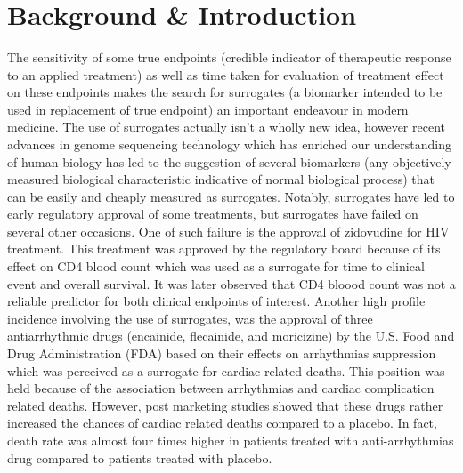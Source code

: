 \documentclass[a4paper,12pt]{article}
\title{
		\begin{flushleft} 
			\Huge {\color{black!90}{\fontfamily{phv}\selectfont 2016\textbullet2017 \\   Faculty of Sciences \\ \large\textit{Master of Statistics} \\ \vspace{1.0in} Master's Thesis \\ Evaluation of Surrogate Endpoints in Human Microbiome \\ \vspace{1.0in} \large Supervisor:\\Prof. dr. Shekdy Ziv \\ \vspace{0.5in} Supervisor:\\ Dr. Van Der Elst, Wim \\ \vspace{1.0in}\Large Olusoji Oluwafemi Daniel\\ \large \textit{Thesis presented in fulfillment of the requirements for the degree of Master of
						Statistics}}}
		\end{flushleft}
	}
\date{}
\begin{document}
	
	
	\maketitle
	\newpage
	
	\tableofcontents
	
	\newpage
	
	\section{Background \& Introduction}
	The sensitivity of some true endpoints (credible indicator of therapeutic response to an applied treatment\citep{buyseM}) as well as time taken for evaluation of treatment effect on these endpoints makes the search for surrogates (a biomarker intended to be used in replacement of true endpoint\citep{buyseM}) an important endeavour in modern medicine\citep{surrogate2}. The use of surrogates actually isn't a wholly new idea\citep{CAST,fleming1}, however recent advances in genome sequencing technology which has enriched our understanding of human biology has led to the suggestion of several biomarkers (any objectively measured biological characteristic indicative of normal biological process\citep{buyseM}) that can be easily and cheaply measured as surrogates\citep{buyseM}. Notably, surrogates have led to early regulatory approval of some treatments\citep{buyseM2,buyseM3}, but surrogates have failed on several other occasions\citep{buyseM,fleming1,fleming2}. One of such failure is the approval of zidovudine for HIV treatment. This treatment was approved by the regulatory board because of its effect on CD4 blood count which was used as a surrogate for time to clinical event and overall survival\citep{lagakos}. It was later observed that CD4 bloood count was not a reliable predictor for both clinical  endpoints of interest\citep{Degruttola}. Another high profile incidence involving the use of surrogates, was the approval of three antiarrhythmic drugs (encainide, flecainide, and moricizine) by the U.S. Food and Drug Administration (FDA) based on their effects on arrhythmias suppression which was perceived as a surrogate for cardiac-related deaths\citep{buyseM}. This position was held because of the association between arrhythmias and cardiac complication related deaths. However, post marketing studies showed that these drugs rather increased the chances of cardiac related deaths compared to a placebo. In fact, death rate was almost four times higher in patients treated with anti-arrhythmias drug compared to patients treated with placebo\citep{Degruttola2}.\\
	
\end{document}
